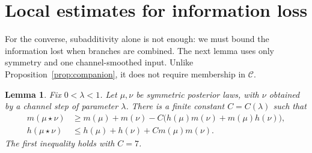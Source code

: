 \documentclass[11pt]{article}
\newtheorem{lemma}[theorem]{Lemma}
\numberwithin{equation}{section}
\newcommand{\calC}{\mathcal C}
\begin{document}
\section{Local estimates for information loss}
\label{sec:moments}

For the converse, subadditivity alone is not enough: we must
bound the information lost when branches are combined. The next
lemma uses only symmetry and one channel-smoothed input. Unlike
Proposition~\ref{prop:companion}, it does not require membership
in $\calC$.

\begin{lemma}\label{lem:local-moments}
Fix $0<\lambda<1$. Let $\mu,\nu$ be symmetric posterior laws,
with $\nu$ obtained by a channel step of parameter $\lambda$.
There is a finite constant $C=C(\lambda)$ such that
\begin{align}
 m(\mu\star\nu)
 &\geq m(\mu)+m(\nu)
   -C\bigl(h(\mu)m(\nu)+m(\mu)h(\nu)\bigr),
       \label{eq:local-m-lower}\\
 h(\mu\star\nu)
 &\leq h(\mu)+h(\nu)+C m(\mu)m(\nu).
       \label{eq:local-h-upper}
\end{align}
The first inequality holds with $C=7$.
\end{lemma}
\end{document}

